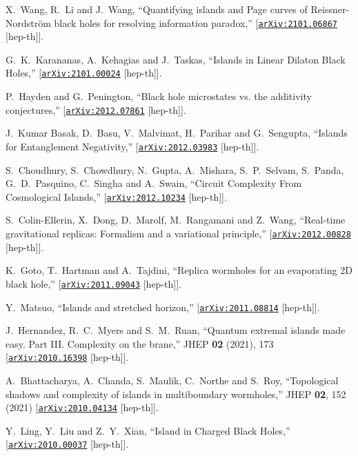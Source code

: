 \documentclass[12pt]{article}
\newcommand \arXiv [1]{\href{http://arxiv.org/abs/#1}{\tt arXiv:#1}}
\begin{document}
\begin{thebibliography}{99}
{%
X.~Wang, R.~Li and J.~Wang,
``Quantifying islands and Page curves of Reissner-Nordstr\"om black holes for resolving information paradox,''
[\arXiv{2101.06867} [hep-th]].

G.~K.~Karananas, A.~Kehagias and J.~Taskas,
``Islands in Linear Dilaton Black Holes,''
[\arXiv{2101.00024} [hep-th]].

P.~Hayden and G.~Penington,
``Black hole microstates vs. the additivity conjectures,''
[\arXiv{2012.07861} [hep-th]].

J.~Kumar Basak, D.~Basu, V.~Malvimat, H.~Parihar and G.~Sengupta,
``Islands for Entanglement Negativity,''
[\arXiv{2012.03983} [hep-th]].

S.~Choudhury, S.~Chowdhury, N.~Gupta, A.~Mishara, S.~P.~Selvam, S.~Panda, G.~D.~Pasquino, C.~Singha and A.~Swain,
``Circuit Complexity From Cosmological Islands,''
[\arXiv{2012.10234} [hep-th]].

S.~Colin-Ellerin, X.~Dong, D.~Marolf, M.~Rangamani and Z.~Wang,
``Real-time gravitational replicas: Formalism and a variational principle,''
[\arXiv{2012.00828} [hep-th]].

K.~Goto, T.~Hartman and A.~Tajdini,
``Replica wormholes for an evaporating 2D black hole,''
[\arXiv{2011.09043} [hep-th]].

Y.~Matsuo,
``Islands and stretched horizon,''
[\arXiv{2011.08814} [hep-th]].

J.~Hernandez, R.~C.~Myers and S.~M.~Ruan,
``Quantum extremal islands made easy. Part III. Complexity on the brane,''
JHEP \textbf{02} (2021), 173
[\arXiv{2010.16398} [hep-th]].

A.~Bhattacharya, A.~Chanda, S.~Maulik, C.~Northe and S.~Roy,
``Topological shadows and complexity of islands in multiboundary wormholes,''
JHEP \textbf{02}, 152 (2021)
[\arXiv{2010.04134} [hep-th]].

Y.~Ling, Y.~Liu and Z.~Y.~Xian,
``Island in Charged Black Holes,''
[\arXiv{2010.00037} [hep-th]].

}
\end{thebibliography}
\end{document}
